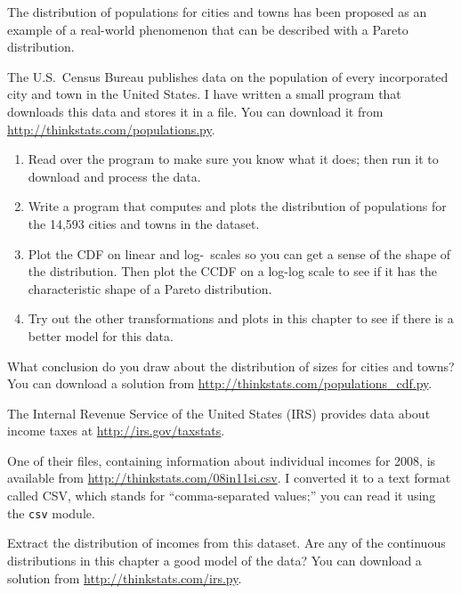 \documentclass[12pt]{book}
\begin{document}
\begin{exercise}
The distribution of populations for cities and towns has been proposed
as an example of a real-world phenomenon that can be described
with a Pareto distribution.

The U.S.~Census Bureau publishes data on the population of every
incorporated city and town in the United States.  I have written a
small program that downloads this data and stores it in a file.  You
can download it from \url{http://thinkstats.com/populations.py}.

\begin{enumerate}

\item Read over the program to make sure you know what it does; then
  run it to download and process the data.

\item Write a program that computes and plots the distribution of
  populations for the 14,593 cities and towns in the dataset.

\item Plot the CDF on linear and log-\x~scales so you can get a sense
  of the shape of the distribution.  Then plot the CCDF on a log-log
  scale to see if it has the characteristic shape of a Pareto
  distribution.

\item Try out the other transformations and plots in this chapter to
  see if there is a better model for this data.

\end{enumerate}

What conclusion do you draw about the distribution of sizes
for cities and towns?  You can download a solution from
\url{http://thinkstats.com/populations_cdf.py}.

\end{exercise}


\begin{exercise}
\label{irs}

The Internal Revenue Service of the United States (IRS) provides data
about income taxes at \url{http://irs.gov/taxstats}.

One of their files, containing information about individual incomes
for 2008, is available from \url{http://thinkstats.com/08in11si.csv}.  I
converted it to a text format called CSV, which stands for
``comma-separated values;'' you can read it using the {\tt csv}
module.

Extract the distribution of incomes from this dataset.  Are any of
the continuous distributions in this chapter a good model of
the data?  You can download a solution from \url{http://thinkstats.com/irs.py}.

\end{exercise}
\end{document}
